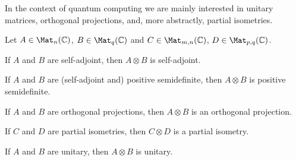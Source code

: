\documentclass[a4paper,oneside, 12pt]{amsart}
\begin{document}
In the context of quantum computing we are mainly interested in unitary matrices, orthogonal projections, and, more abstractly, partial isometries.

\begin{lemma}\label{lem:matrix-properties}
  Let \( A \in \Mat_n(\mathbb{C}) \), \( B \in \Mat_q(\mathbb{C}) \) and
  \(C \in \Mat_{m,n}( \mathbb{C})\), \( D \in \Mat_{p,q}( \mathbb{C})\).
  \begin{thmlist}
    \item If \( A \) and \( B \) are self-adjoint, then \( A \otimes B \) is self-adjoint.
    \item If \( A \) and \( B \) are (self-adjoint and) positive semidefinite, then \( A \otimes B \) is positive semidefinite.
    \item If \( A \) and \( B \) are orthogonal projections, then \( A \otimes B \) is an orthogonal projection.
    \item If \( C \) and \( D \) are partial isometries, then \( C \otimes D \) is a partial isometry.
    \item If \( A \) and \( B \) are unitary, then \( A \otimes B \) is unitary.
  \end{thmlist}
\end{lemma}
\end{document}

